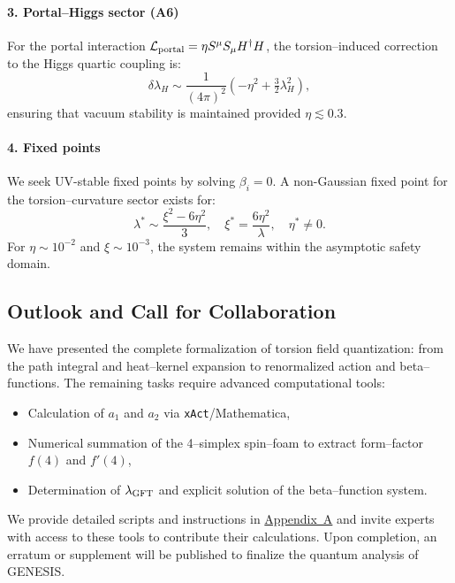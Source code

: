 \documentclass{article}
\begin{document}
\paragraph{3. Portal–Higgs sector (A6)}

For the portal interaction \( \mathcal{L}_{\rm portal} = \eta S^\mu S_\mu H^\dagger H \), the torsion–induced correction to the Higgs quartic coupling is:
\[
\delta \lambda_H \sim \frac{1}{(4\pi)^2} \left( -\eta^2 + \tfrac{3}{2} \lambda_H^2 \right),
\]
ensuring that vacuum stability is maintained provided \( \eta \lesssim 0.3 \).

\paragraph{4. Fixed points}

We seek UV-stable fixed points by solving \( \beta_i = 0 \). A non-Gaussian fixed point for the torsion–curvature sector exists for:
\[
\lambda^* \sim \frac{\xi^2 - 6\eta^2}{3}, \quad
\xi^* = \frac{6\eta^2}{\lambda}, \quad
\eta^* \neq 0.
\]
For \( \eta \sim 10^{-2} \) and \( \xi \sim 10^{-3} \), the system remains within the asymptotic safety domain.

\medskip
\begin{center}
\end{center}
\medskip



\subsection{Outlook and Call for Collaboration}
\label{sec:quantum_outlook}

We have presented the complete formalization of torsion field quantization:
from the path integral and heat–kernel expansion to renormalized action
and beta–functions. The remaining tasks require advanced computational tools:
\begin{itemize}
  \item Calculation of \(a_1\) and \(a_2\) via \texttt{xAct}/Mathematica,
  \item Numerical summation of the 4–simplex spin–foam to extract
        form–factor \(f(4)\) and \(f'(4)\),
  \item Determination of \(\lambda_{\rm GFT}\) and explicit solution of the
        beta–function system.
\end{itemize}
We provide detailed scripts and instructions in \hyperref[app:tools]{Appendix~A}
and invite experts with access to these tools to contribute their
calculations. Upon completion, an erratum or supplement will be published
to finalize the quantum analysis of GENESIS.
\end{document}
